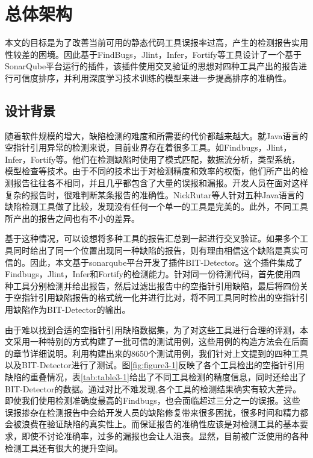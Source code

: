 \chapter{总体架构}

本文的目标是为了改善当前可用的静态代码工具误报率过高，产生的检测报告实用性较差的困境。因此基于FindBugs，Jlint，Infer，Fortify等工具设计了一个基于SonarQube平台运行的插件，该插件使用交叉验证的思想对四种工具产出的报告进行可信度排序，并利用深度学习技术训练的模型来进一步提高排序的准确性。

\section{设计背景}
随着软件规模的增大，缺陷检测的难度和所需要的代价都越来越大。就Java语言的空指针引用异常的检测来说，目前业界存在着很多工具。如Findbugs，Jlint，Infer，Fortify等。他们在检测缺陷时使用了模式匹配，数据流分析，类型系统，模型检查等技术。由于不同的技术出于对检测精度和效率的权衡，他们所产出的检测报告往往各不相同，并且几乎都包含了大量的误报和漏报。开发人员在面对这样复杂的报告时，很难判断某条报告的准确性。NickRutar\cite{rutar2004comparison}等人针对五种Java语言的缺陷检测工具做了比较，发现没有任何一个单一的工具是完美的。此外，不同工具所产出的报告之间也有不小的差异。

基于这种情况，可以设想将多种工具的报告汇总到一起进行交叉验证。如果多个工具同时给出了同一个位置出现同一种缺陷的报告，则有理由相信这个缺陷是真实可信的。因此，本文基于sonarqube平台开发了插件BIT-Detector。这个插件集成了Findbugs，Jlint，Infer和Fortify的检测能力。针对同一份待测代码，首先使用四种工具分别检测并给出报告，然后过滤出报告中的空指针引用缺陷，最后将四份关于空指针引用缺陷报告的格式统一化并进行比对，将不同工具同时检出的空指针引用缺陷作为BIT-Detector的输出。

由于难以找到合适的空指针引用缺陷数据集，为了对这些工具进行合理的评测，本文采用一种特别的方式构建了一批可信的测试用例，这些用例的构造方法会在后面的章节详细说明。利用构建出来的8650个测试用例，我们针对上文提到的四种工具以及BIT-Detector进行了测试。图\ref{fig:figure3-1}反映了各个工具检出的空指针引用缺陷的重叠情况，表\ref{tab:table3-1}给出了不同工具检测的精度信息，同时还给出了BIT-Detector的数据。通过对比不难发现,各个工具的检测结果确实有较大差异。即使我们使用检测准确度最高的Findbugs，也会面临超过三分之一的误报。这些误报掺杂在检测报告中会给开发人员的缺陷修复带来很多困扰，很多时间和精力都会被浪费在验证缺陷的真实性上。而保证报告的准确性应该是对检测工具的基本要求，即使不讨论准确率，过多的漏报也会让人沮丧。显然，目前被广泛使用的各种检测工具还有很大的提升空间。


